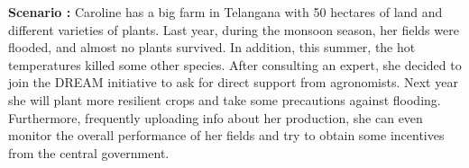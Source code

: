 \begin{flushleft}
\textbf{Scenario :} 
Caroline has a big farm in Telangana with 50 hectares of land and different varieties of plants. Last year, during the monsoon season, her fields were flooded, and almost no plants survived. In addition, this summer, the hot temperatures killed some other species.
After consulting an expert, she decided to join the DREAM initiative to ask for direct support from agronomists. Next year she will plant more resilient crops and take some precautions against flooding.
Furthermore, frequently uploading info about her production, she can even monitor the overall performance of her fields and try to obtain some incentives from the central government.
\end{flushleft}